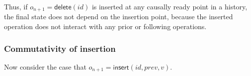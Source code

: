 \documentclass[a4paper,twocolumn,10pt]{article}
\begin{document}
Thus, if $o_{n+1}=\mathsf{delete}(\mathit{id})$ is inserted at any causally ready point in a history, the final state does not depend on the insertion point, because the inserted operation does not interact with any prior or following operations.

\subsubsection{Commutativity of insertion}

Now consider the case that $o_{n+1}=\mathsf{insert}(\mathit{id}, \mathit{prev}, v)$.

{\footnotesize

{}}
\end{document}
